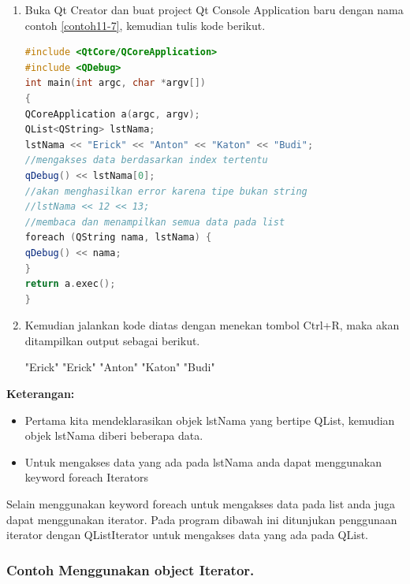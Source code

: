 \begin{enumerate}

\item
  Buka Qt Creator dan buat project Qt Console Application baru dengan
  nama contoh \ref{contoh11-7}, kemudian tulis kode berikut.

\begin{lstlisting}[language=c++, caption=Menggunakan QList,label=contoh11-7]
#include <QtCore/QCoreApplication>
#include <QDebug>
int main(int argc, char *argv[])
{
QCoreApplication a(argc, argv);
QList<QString> lstNama;
lstNama << "Erick" << "Anton" << "Katon" << "Budi";
//mengakses data berdasarkan index tertentu
qDebug() << lstNama[0];
//akan menghasilkan error karena tipe bukan string
//lstNama << 12 << 13;
//membaca dan menampilkan semua data pada list
foreach (QString nama, lstNama) {
qDebug() << nama;
}
return a.exec();
}
\end{lstlisting}
\item
  Kemudian jalankan kode diatas dengan menekan tombol Ctrl+R, maka akan
  ditampilkan output sebagai berikut.
  
\begin{lcverbatim}
"Erick"
"Erick"
"Anton"
"Katon"
"Budi"
\end{lcverbatim}
\end{enumerate}

\textbf{Keterangan:}

\begin{itemize}

\item
  Pertama kita mendeklarasikan objek lstNama yang bertipe QList,
  kemudian objek lstNama diberi beberapa data.
\item
  Untuk mengakses data yang ada pada lstNama anda dapat menggunakan
  keyword foreach Iterators
\end{itemize}

Selain menggunakan keyword foreach untuk mengakses data pada list anda
juga dapat menggunakan iterator. Pada program dibawah ini ditunjukan
penggunaan iterator dengan QListIterator untuk mengakses data yang ada
pada QList.

\subsubsection*{Contoh  Menggunakan object Iterator.}

